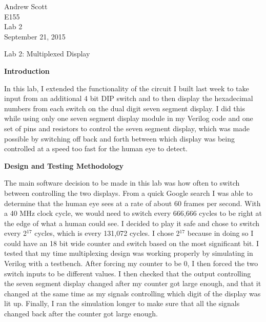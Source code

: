 \documentclass[11pt,letterpaper]{article}
\begin{document}
\begin{flushright}
Andrew Scott\\
E155\\
Lab 2\\
September 21, 2015
\end{flushright}

\begin{center}
Lab 2: Multiplexed Display
\end{center}

\noindent\textbf{Introduction}

In this lab, I extended the functionality of the circuit I built last week to take input from an additional 4 bit DIP switch and to then display the hexadecimal numbers from each switch on the dual digit seven segment display. I did this while using only one seven segment display module in my Verilog code and one set of pins and resistors to control the seven segment display, which was made possible by switching off back and forth between which display was being controlled at a speed too fast for the human eye to detect.

\noindent\textbf{Design and Testing Methodology}

The main software decision to be made in this lab was how often to switch between controlling the two displays. From a quick Google search I was able to determine that the human eye sees at a rate of about 60 frames per second. With a 40 MHz clock cycle, we would need to switch every 666,666 cycles to be right at the edge of what a human could see. I decided to play it safe and chose to switch every 2$^{17}$ cycles, which is every 131,072 cycles. I chose 2$^{17}$ because in doing so I could have an 18 bit wide counter and switch based on the most significant bit. I tested that my time multiplexing design was working properly by simulating in Verilog with a testbench. After forcing my counter to be 0, I then forced the two switch inputs to be different values. I then checked that the output controlling the seven segment display changed after my counter got large enough, and that it changed at the same time as my signals controlling which digit of the display was lit up. Finally, I ran the simulation longer to make sure that all the signals changed back after the counter got large enough.
\end{document}
